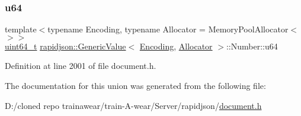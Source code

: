 \mbox{\label{unionrapidjson_1_1_generic_value_1_1_number_a83aa039bfe1f5d2ecd2a6ee76d1f801b}} 
\subsubsection{\texorpdfstring{u64}{u64}}
{\footnotesize\ttfamily template$<$typename Encoding, typename Allocator = Memory\+Pool\+Allocator$<$$>$$>$ \\
\mbox{\hyperlink{stdint_8h_aec6fcb673ff035718c238c8c9d544c47}{uint64\+\_\+t}} \mbox{\hyperlink{classrapidjson_1_1_generic_value}{rapidjson\+::\+Generic\+Value}}$<$ \mbox{\hyperlink{classrapidjson_1_1_encoding}{Encoding}}, \mbox{\hyperlink{classrapidjson_1_1_allocator}{Allocator}} $>$\+::Number\+::u64}



Definition at line 2001 of file document.\+h.



The documentation for this union was generated from the following file\+:\begin{DoxyCompactItemize}
\item 
D\+:/cloned repo trainawear/train-\/\+A-\/wear/\+Server/rapidjson/\mbox{\hyperlink{document_8h}{document.\+h}}\end{DoxyCompactItemize}
